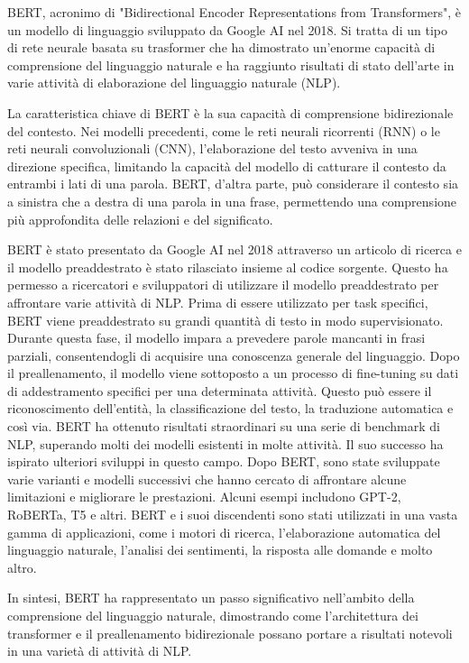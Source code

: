 BERT, acronimo di "Bidirectional Encoder Representations from Transformers", è un modello di linguaggio sviluppato da Google AI nel 2018. Si tratta di un tipo di rete neurale basata su trasformer che ha dimostrato un'enorme capacità di comprensione del linguaggio naturale e ha raggiunto risultati di stato dell'arte in varie attività di elaborazione del linguaggio naturale (NLP).

La caratteristica chiave di BERT è la sua capacità di comprensione bidirezionale del contesto. Nei modelli precedenti, come le reti neurali ricorrenti (RNN) o le reti neurali convoluzionali (CNN), l'elaborazione del testo avveniva in una direzione specifica, limitando la capacità del modello di catturare il contesto da entrambi i lati di una parola. BERT, d'altra parte, può considerare il contesto sia a sinistra che a destra di una parola in una frase, permettendo una comprensione più approfondita delle relazioni e del significato.

BERT è stato presentato da Google AI nel 2018 attraverso un articolo di ricerca e il modello preaddestrato è stato rilasciato insieme al codice sorgente. Questo ha permesso a ricercatori e sviluppatori di utilizzare il modello preaddestrato per affrontare varie attività di NLP.
Prima di essere utilizzato per task specifici, BERT viene preaddestrato su grandi quantità di testo in modo supervisionato. Durante questa fase, il modello impara a prevedere parole mancanti in frasi parziali, consentendogli di acquisire una conoscenza generale del linguaggio.
Dopo il preallenamento, il modello viene sottoposto a un processo di fine-tuning su dati di addestramento specifici per una determinata attività. Questo può essere il riconoscimento dell'entità, la classificazione del testo, la traduzione automatica e così via.
BERT ha ottenuto risultati straordinari su una serie di benchmark di NLP, superando molti dei modelli esistenti in molte attività. Il suo successo ha ispirato ulteriori sviluppi in questo campo.
Dopo BERT, sono state sviluppate varie varianti e modelli successivi che hanno cercato di affrontare alcune limitazioni e migliorare le prestazioni. Alcuni esempi includono GPT-2, RoBERTa, T5 e altri.
BERT e i suoi discendenti sono stati utilizzati in una vasta gamma di applicazioni, come i motori di ricerca, l'elaborazione automatica del linguaggio naturale, l'analisi dei sentimenti, la risposta alle domande e molto altro.

In sintesi, BERT ha rappresentato un passo significativo nell'ambito della comprensione del linguaggio naturale, dimostrando come l'architettura dei transformer e il preallenamento bidirezionale possano portare a risultati notevoli in una varietà di attività di NLP.